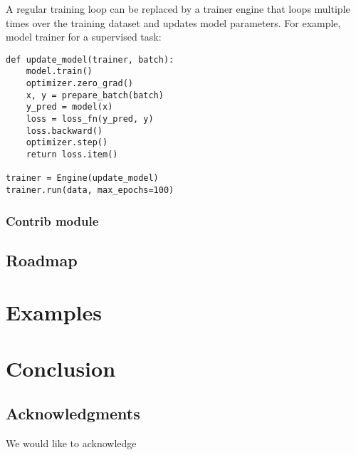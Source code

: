 \documentclass{article}
\begin{document}
A regular training loop can be replaced by a trainer engine that loops multiple times over the training dataset and updates model parameters. 
For example, model trainer for a supervised task: 

\begin{verbatim}
def update_model(trainer, batch):
    model.train()
    optimizer.zero_grad()
    x, y = prepare_batch(batch)
    y_pred = model(x)
    loss = loss_fn(y_pred, y)
    loss.backward()
    optimizer.step()
    return loss.item()

trainer = Engine(update_model)
trainer.run(data, max_epochs=100)
\end{verbatim}
    
\subsubsection{Contrib module}


\subsection{Roadmap}




\section{Examples}


\section{Conclusion}


\subsection{Acknowledgments} 

We would like to acknowledge 


\end{document}
